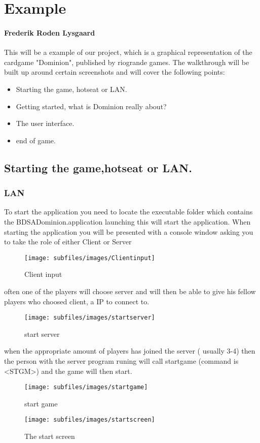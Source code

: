 \section{Example}
\paragraph{Frederik Roden Lysgaard}
This will be a example of our project, which is a graphical representation of the cardgame "Dominion", published by riogrande games.
The walkthrough will be built up around certain screenshots and will cover the following points:

\begin{itemize}
\item Starting the game, hotseat or LAN.
\item Getting started, what is Dominion really about?
\item The user interface.
\item end of game.
\end{itemize}

\subsection{Starting the game,hotseat or LAN.}
\subsubsection{LAN}
To start the application you need to locate the executable folder which contains the BDSADominion.application launching this will start the application. When starting the application you will be presented with a console window asking you to take the role of either Client or Server

\begin{figure}[h!]
\centering
\texttt{[image: subfiles/images/Clientinput]}
\caption{Client input}
\end{figure}

often one of the players will choose server and will then be able to give his fellow players who choosed client, a IP to connect to.
\begin{figure}[h!]
\centering
\texttt{[image: subfiles/images/startserver]}
\caption{start server}
\end{figure}
when the appropriate amount of players has joined the server ( usually 3-4) then the person with the server program runing will
call startgame (command is \textless STGM\textgreater ) and the game will then start.
\begin{figure}[h!]
\centering
\texttt{[image: subfiles/images/startgame]}
\caption{start game}
\end{figure}
\begin{figure}[h!]
\centering
\texttt{[image: subfiles/images/startscreen]}
\caption{The start screen}
\end{figure}
